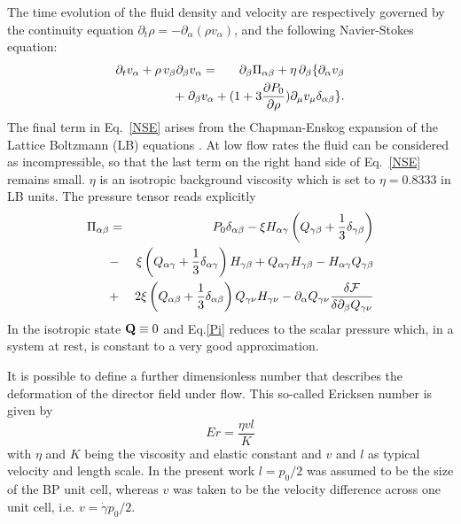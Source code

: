 \documentclass[aps,pre,reprint,superscriptaddress, twocolumn]{revtex4}
\begin{document}
The time evolution of the fluid density and velocity are respectively governed
by the continuity equation
$\partial_t \rho = -\partial_\alpha(\rho v_\alpha)$, and
the following Navier-Stokes equation:
\begin{eqnarray}
\partial_t v_\alpha +\rho \,v_\beta \partial_\beta v_\alpha
&=& \partial_\beta \Pi_{\alpha \beta}+ \eta\, \partial_\beta \{ \partial_\alpha v_\beta \nonumber\\
& &\hspace*{-1.5cm} +\; \partial_\beta v_\alpha
+(1+3\frac{\partial P_0}{\partial\rho} )\partial_\mu v_\mu \delta_{\alpha \beta}\}. 
\label{NSE}
\end{eqnarray}
The final term in Eq.~\ref{NSE} arises from the Chapman-Enskog expansion
of the Lattice Boltzmann (LB) equations \cite{Denniston:2001}.
At low flow rates the fluid can be considered as incompressible, so that the
last term on the right hand side of Eq.~\ref{NSE} remains small.
$\eta$ is an isotropic background viscosity which is set to $\eta=0.8333$ in LB units.
The pressure tensor reads explicitly
\begin{eqnarray}
\Pi_{\alpha \beta}&=&P_0 \delta_{\alpha\beta}
-\xi H_{\alpha \gamma}\left(Q_{\gamma \beta} +\frac{1}{3} \delta_{\gamma \beta}\right)\nonumber\\
&-&\xi \left(Q_{\alpha \gamma} +\frac{1}{3} \delta_{\alpha \gamma}\right) H_{\gamma \beta} + Q_{\alpha \gamma}H_{\gamma \beta}-H_{\alpha \gamma} Q_{\gamma \beta} \nonumber\\
&+&2 \xi  \left(Q_{\alpha \beta} +\frac{1}{3} \delta_{\alpha \beta}\right) Q_{\gamma \nu} H_{\gamma \nu}
- \partial_\alpha Q_{\gamma \nu} \frac{\delta{\cal F}}{\delta \partial_{\beta} Q_{\gamma \nu}}\nonumber\\
\label{Pi}
\end{eqnarray}
In the isotropic state ${\bf Q}\equiv 0$ and Eq.\ref{Pi} reduces to the
scalar pressure which, in a system at rest, is constant to a very good
approximation.

It is possible to define a further 
dimensionless number that describes the deformation
of the director field under flow. This so-called Ericksen number
is given by 
\begin{equation}
Er=\frac{\eta v l}{K}
\end{equation}
with $\eta$ and $K$ being the viscosity and elastic constant and
$v$ and $l$ as typical velocity and length scale. 
In the present work $l=p_0/2$ was assumed to be the size of the BP unit cell,
whereas $v$ was taken to be the velocity difference
across one unit cell, i.e. $v=\dot{\gamma} p_0/2$. 
\end{document}
